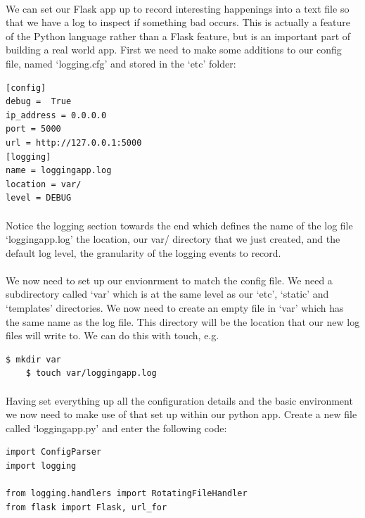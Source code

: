 \documentclass[12pt, a4paper, oneside]{book}
\begin{document}
{\paragraph{} We can set our Flask app up to record interesting happenings into a text file so that we have a log to inspect if something bad occurs. This is actually a feature of the Python language rather than a Flask feature, but is an important part of building a real world app. First we need to make some additions to our config file, named `logging.cfg' and stored in the  `etc' folder:

\begin{lstlisting}
[config]
debug =  True
ip_address = 0.0.0.0
port = 5000
url = http://127.0.0.1:5000
[logging]
name = loggingapp.log
location = var/
level = DEBUG
\end{lstlisting}
\paragraph{} Notice the logging section towards the end which defines the name of the log file `loggingapp.log' the location, our var/ directory that we just created, and the default log level, the granularity of the logging events to record. 
\paragraph{} We now need to set up our envionrment to match the config file. We need a subdirectory called `var' which is at the same level as our `etc', `static' and `templates' directories. We now need to create an empty file in `var' which has the same name as the log file. This directory will be the location that our new log files will write to. We can do this with touch, e.g.

\begin{lstlisting}[style=DOS]
    $ mkdir var
    $ touch var/loggingapp.log
\end{lstlisting}

\paragraph{} Having set everything up all the configuration details and the basic environment we now need to make use of that set up within our python app. Create a new file called `loggingapp.py' and enter the following code:
\begin{lstlisting}
import ConfigParser
import logging

from logging.handlers import RotatingFileHandler
from flask import Flask, url_for


\end{lstlisting}}
\end{document}
